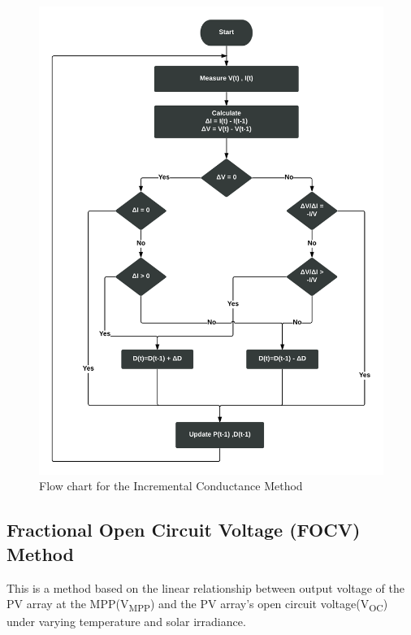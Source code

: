 {  
   \begin{figure}[H]
      \begin{center}
      \includegraphics[width=\textwidth]{images/INc_flow}
      \caption{ Flow chart for the Incremental Conductance Method}
      \label{fig:inCflow}
      \end{center}
      \end{figure}
      
  \subsection{Fractional Open Circuit Voltage (FOCV) Method  } \label{sec:focv_sec}
    
  This is a method based on the linear relationship between output voltage of the \ac{PV} array at the \ac{MPP}(V\textsubscript{MPP}) and the \ac{PV} array's open circuit voltage(V\textsubscript{OC}) under varying temperature and solar irradiance. \\
  
}
